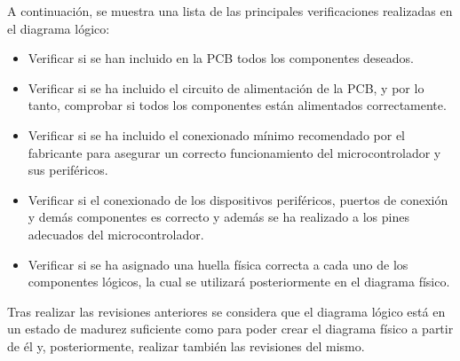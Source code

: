 A continuación, se muestra una lista de las principales verificaciones realizadas en el diagrama lógico:
\begin{itemize}

    \item Verificar si se han incluido en la \ac{PCB} todos los componentes deseados.
    
    \item Verificar si se ha incluido el circuito de alimentación de la \ac{PCB}, y por lo tanto, comprobar si todos los componentes están alimentados correctamente.
    
    \item Verificar si se ha incluido el conexionado mínimo recomendado por el fabricante para asegurar un correcto funcionamiento del microcontrolador y sus periféricos.
    
    \item Verificar si el conexionado de los dispositivos periféricos, puertos de conexión y demás componentes es correcto y además se ha realizado a los pines adecuados del microcontrolador.
    
    \item Verificar si se ha asignado una huella física correcta a cada uno de los componentes lógicos, la cual se utilizará posteriormente en el diagrama físico.
    
\end{itemize}

Tras realizar las revisiones anteriores se considera que el diagrama lógico está en un estado de madurez suficiente como para poder crear el diagrama físico a partir de él y, posteriormente, realizar también las revisiones del mismo.


